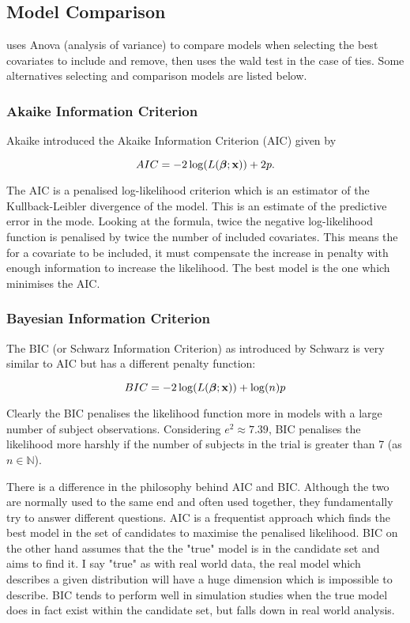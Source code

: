 \subsection{Model Comparison}\label{sec:model-comparison}

 uses Anova (analysis of variance) to compare models when selecting the best covariates to include and remove, then uses the wald test in the case of ties. Some alternatives selecting and comparison models are listed below.

\subsubsection{Akaike Information Criterion}

Akaike  introduced the Akaike Information Criterion (AIC) given by

\begin{equation}
    AIC = -2\log(L(\boldsymbol{\beta};\textbf{x}))+2p.
\end{equation}

The AIC is a penalised log-likelihood criterion which is an estimator of the Kullback-Leibler divergence of the model. This is an estimate of the predictive error in the mode. Looking at the formula, twice the negative log-likelihood function is penalised by twice the number of included covariates. This means the for a covariate to be included, it must compensate the increase in penalty with enough information to increase the likelihood. The best model is the one which minimises the AIC.

\subsubsection{Bayesian Information Criterion}

The BIC (or Schwarz Information Criterion) as introduced by Schwarz  is very similar to AIC but has a different penalty function:

\begin{equation}
    BIC = -2\log(L(\boldsymbol{\beta};\textbf{x}))+\log(n)p
\end{equation}

Clearly the BIC penalises the likelihood function more in models with a large number of subject observations. Considering $e^2\approx7.39$, BIC penalises the likelihood more harshly if the number of subjects in the trial is greater than 7 (as $n\in\mathbb{N}$).

There is a difference in the philosophy behind AIC and BIC. Although the two are normally used to the same end and often used together, they fundamentally try to answer different questions. AIC is a frequentist approach which finds the best model in the set of candidates to maximise the penalised likelihood. BIC on the other hand assumes that the the "true" model is in the candidate set and aims to find it. I say "true" as with real world data, the real model which describes a given distribution will have a huge dimension which is impossible to describe. BIC tends to perform well in simulation studies when the true model does in fact exist within the candidate set, but falls down in real world analysis.


